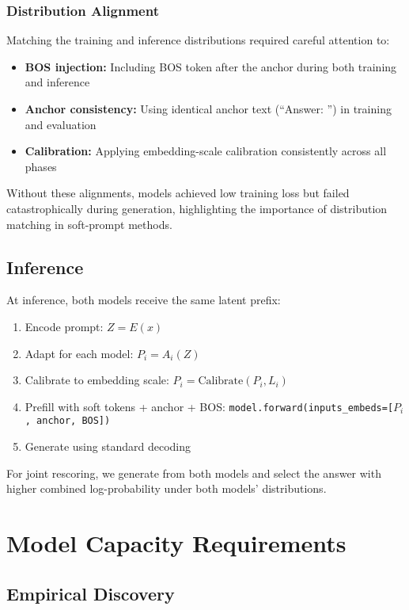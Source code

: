 \documentclass{article}
\begin{document}
\subsubsection{Distribution Alignment}

Matching the training and inference distributions required careful attention to:
\begin{itemize}
\item \textbf{BOS injection:} Including BOS token after the anchor during both training and inference
\item \textbf{Anchor consistency:} Using identical anchor text (``Answer: '') in training and evaluation
\item \textbf{Calibration:} Applying embedding-scale calibration consistently across all phases
\end{itemize}

Without these alignments, models achieved low training loss but failed catastrophically during generation, highlighting the importance of distribution matching in soft-prompt methods.

\subsection{Inference}

At inference, both models receive the same latent prefix:
\begin{enumerate}
\item Encode prompt: $Z = E(x)$
\item Adapt for each model: $P_i = A_i(Z)$
\item Calibrate to embedding scale: $P_i = \text{Calibrate}(P_i, L_i)$
\item Prefill with soft tokens + anchor + BOS: \texttt{model.forward(inputs\_embeds=[$P_i$, anchor, BOS])}
\item Generate using standard decoding
\end{enumerate}

For joint rescoring, we generate from both models and select the answer with higher combined log-probability under both models' distributions.

\section{Model Capacity Requirements}
\label{sec:capacity}

\subsection{Empirical Discovery}
\end{document}
